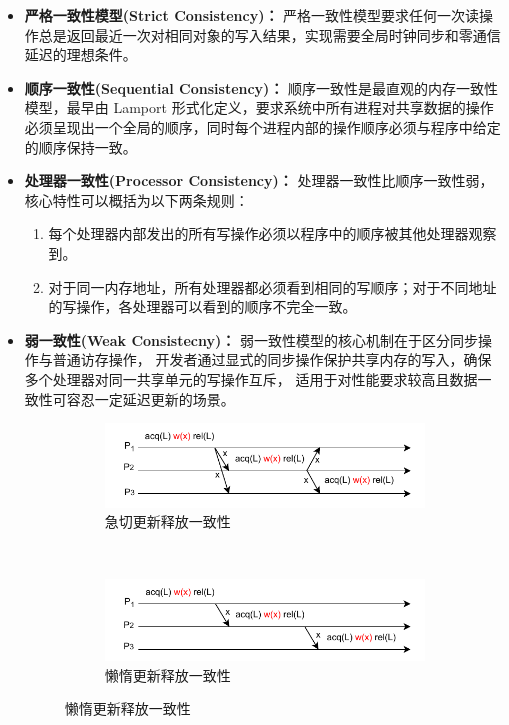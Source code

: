 {    \begin{itemize}
        \item \textbf{严格一致性模型(Strict Consistency)：} 严格一致性模型要求任何一次读操作总是返回最近一次对相同对象的写入结果，实现需要全局时钟同步和零通信延迟的理想条件。

        \item \textbf{顺序一致性(Sequential Consistency)：} 顺序一致性是最直观的内存一致性模型，最早由 Lamport 形式化定义，要求系统中所有进程对共享数据的操作必须呈现出一个全局的顺序，同时每个进程内部的操作顺序必须与程序中给定的顺序保持一致。

        \item \textbf{处理器一致性(Processor Consistency)：} 处理器一致性比顺序一致性弱，核心特性可以概括为以下两条规则：
              \begin{enumerate}[label=\arabic*.]
                  \item 每个处理器内部发出的所有写操作必须以程序中的顺序被其他处理器观察到。
                  \item 对于同一内存地址，所有处理器都必须看到相同的写顺序；对于不同地址的写操作，各处理器可以看到的顺序不完全一致。
              \end{enumerate}

        \item \textbf{弱一致性(Weak Consistecny)：} 弱一致性模型的核心机制在于区分同步操作与普通访存操作，
              开发者通过显式的同步操作保护共享内存的写入，确保多个处理器对同一共享单元的写操作互斥，
              适用于对性能要求较高且数据一致性可容忍一定延迟更新的场景。

              \begin{figure}[!htbp]
                  \centering
                  \begin{subfigure}[b]{0.8\textwidth}
                      \includegraphics[width=\textwidth]{Img/急切更新释放一致性.drawio.pdf}
                      \caption{急切更新释放一致性}
                      \label{fig:eager-release-consistency}
                  \end{subfigure}
                  \\
                  \begin{subfigure}[b]{0.8\textwidth}
                      \includegraphics[width=\textwidth]{Img/懒惰更新释放一致性.drawio.pdf}
                      \caption{懒惰更新释放一致性}
                      \label{fig:lazy-release-consistency}
                  \end{subfigure}


\end{figure}
\end{itemize}}
